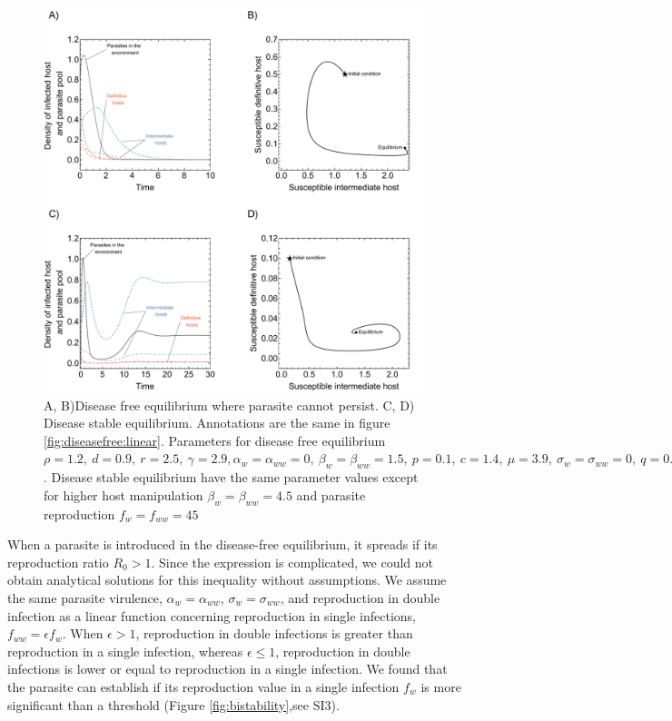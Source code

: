 \documentclass[11pt]{article}
\begin{document}
\begin{figure}[!ht]
\includegraphics[width=\textwidth]{Figures/ecotraject_nonlinear.pdf}
\caption{A, B)Disease free equilibrium where parasite cannot persist. C, D) Disease stable equilibrium. Annotations are the same in figure \ref{fig:diseasefree:linear}. Parameters for disease free equilibrium $\rho =  1.2, \ d = 0.9, \  r = 2.5, \ \gamma =  2.9, \alpha_w = \alpha_{ww} =  0, \ \beta_w = \beta_{ww} = 1.5, \ p = 0.1, \  c = 1.4, \ \mu = 3.9, \ \sigma_w = \sigma_{ww} = 0, \ q = 0.01, \ f_w = f_{ww} = 7.5, \ \delta = 0.9, \ k = 0.26$. Disease stable equilibrium have the same parameter values except for higher host manipulation $ \beta_w =  \beta_{ww} = 4.5$ and parasite reproduction $ f_w  = f_{ww} = 45$}
\label{fig:ecotraject:nonlinear}
\end{figure}

When a parasite is introduced in the disease-free equilibrium, it spreads if its reproduction ratio $R_0 > 1$. 
Since the expression is complicated, we could not obtain analytical solutions for this inequality without assumptions. 
We assume the same parasite virulence, $\alpha_w = \alpha_{ww}$, $\sigma_w = \sigma_{ww}$, and reproduction in double infection as a linear function concerning reproduction in single infections, $f_{ww} = \epsilon f_w$. 
When $\epsilon > 1$, reproduction in double infections is greater than reproduction in a single infection, whereas $\epsilon \leq 1$, reproduction in double infections is lower or equal to reproduction in a single infection.
We found that the parasite can establish if its reproduction value in a single infection $f_w$ is more significant than a threshold (Figure \ref{fig:bistability},see SI3). 
\end{document}
